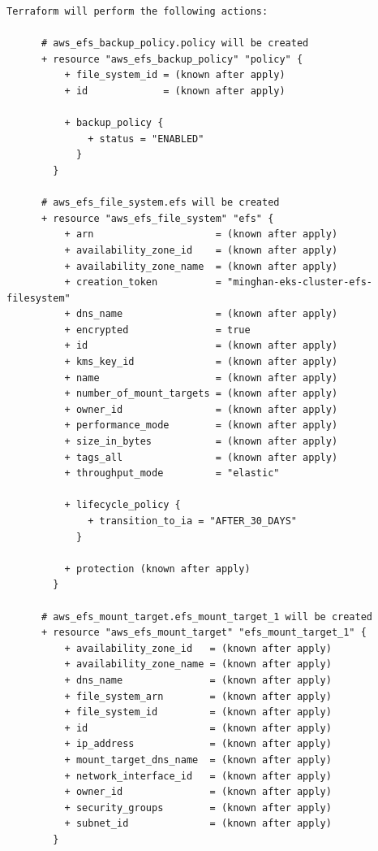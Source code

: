 \begin{lstlisting}[caption={terraform plan output for \texttt{cloudkube} provisioning}, breaklines=true, breakatwhitespace=false]
    Terraform will perform the following actions:
    
      # aws_efs_backup_policy.policy will be created
      + resource "aws_efs_backup_policy" "policy" {
          + file_system_id = (known after apply)
          + id             = (known after apply)
    
          + backup_policy {
              + status = "ENABLED"
            }
        }
    
      # aws_efs_file_system.efs will be created
      + resource "aws_efs_file_system" "efs" {
          + arn                     = (known after apply)
          + availability_zone_id    = (known after apply)
          + availability_zone_name  = (known after apply)
          + creation_token          = "minghan-eks-cluster-efs-filesystem"
          + dns_name                = (known after apply)
          + encrypted               = true
          + id                      = (known after apply)
          + kms_key_id              = (known after apply)
          + name                    = (known after apply)
          + number_of_mount_targets = (known after apply)
          + owner_id                = (known after apply)
          + performance_mode        = (known after apply)
          + size_in_bytes           = (known after apply)
          + tags_all                = (known after apply)
          + throughput_mode         = "elastic"
    
          + lifecycle_policy {
              + transition_to_ia = "AFTER_30_DAYS"
            }
    
          + protection (known after apply)
        }
    
      # aws_efs_mount_target.efs_mount_target_1 will be created
      + resource "aws_efs_mount_target" "efs_mount_target_1" {
          + availability_zone_id   = (known after apply)
          + availability_zone_name = (known after apply)
          + dns_name               = (known after apply)
          + file_system_arn        = (known after apply)
          + file_system_id         = (known after apply)
          + id                     = (known after apply)
          + ip_address             = (known after apply)
          + mount_target_dns_name  = (known after apply)
          + network_interface_id   = (known after apply)
          + owner_id               = (known after apply)
          + security_groups        = (known after apply)
          + subnet_id              = (known after apply)
        }
    

\end{lstlisting}
